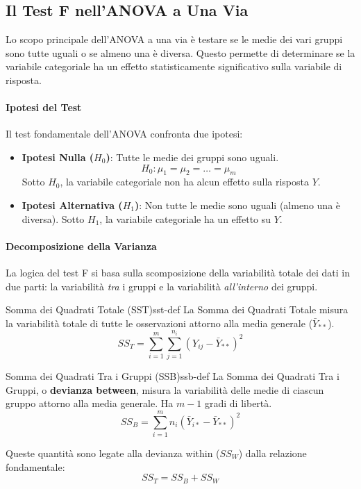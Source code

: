 \subsection{Il Test F nell'ANOVA a Una Via}
Lo scopo principale dell'ANOVA a una via è testare se le medie dei vari gruppi sono tutte uguali o se almeno una è diversa. Questo permette di determinare se la variabile categoriale ha un effetto statisticamente significativo sulla variabile di risposta.

\paragraph{Ipotesi del Test}
Il test fondamentale dell'ANOVA confronta due ipotesi:
\begin{itemize}
    \item \textbf{Ipotesi Nulla (\(H_0\))}: Tutte le medie dei gruppi sono uguali.
    \[ H_0: \mu_1 = \mu_2 = \dots = \mu_m \]
    Sotto \(H_0\), la variabile categoriale non ha alcun effetto sulla risposta \(Y\).
    \item \textbf{Ipotesi Alternativa (\(H_1\))}: Non tutte le medie sono uguali (almeno una è diversa). Sotto \(H_1\), la variabile categoriale ha un effetto su \(Y\).
\end{itemize}

\paragraph{Decomposizione della Varianza}
La logica del test F si basa sulla scomposizione della variabilità totale dei dati in due parti: la variabilità \textit{tra} i gruppi e la variabilità \textit{all'interno} dei gruppi.

\begin{definizione}{Somma dei Quadrati Totale (SST)}{sst-def}
La Somma dei Quadrati Totale misura la variabilità totale di tutte le osservazioni attorno alla media generale (\(\bar{Y}_{**}\)).
\[SS_T = \sum_{i=1}^{m}\sum_{j=1}^{n_i} (Y_{ij} - \bar{Y}_{**})^2\]
\end{definizione}

\begin{definizione}{Somma dei Quadrati Tra i Gruppi (SSB)}{ssb-def}
La Somma dei Quadrati Tra i Gruppi, o \textbf{devianza between}, misura la variabilità delle medie di ciascun gruppo attorno alla media generale. Ha \(m-1\) gradi di libertà.
\[ SS_B = \sum_{i=1}^{m} n_i (\bar{Y}_{i*} - \bar{Y}_{**})^2 \]
\end{definizione}
Queste quantità sono legate alla devianza within (\(SS_W\)) dalla relazione
fondamentale:
\[
    SS_T = SS_B + SS_W
\]

